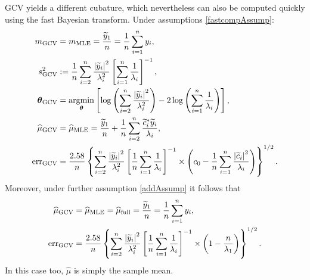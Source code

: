 \documentclass{iitthesis}          %
\newcommand{\bm}[1]{\boldsymbol{#1}}
\newcommand{\vtheta}{{\bm{\theta}}}
\newcommand{\hmu}{\widehat{\mu}}
\newcommand{\MLE}{\textup{MLE}}
\newcommand{\GCV}{\textup{GCV}}
\newcommand{\err}{\textup{err}}
\def\abs#1{\ensuremath{\left \lvert #1 \right \rvert}}
\providecommand{\argmin}{\operatorname*{argmin}}
\begin{document}
GCV yields a different cubature, which nevertheless can also be computed quickly using the fast Bayesian transform.  Under assumptions \eqref{fastcompAssump}:
\begin{align*}
\nonumber
m_{\textup{GCV}} & = m_\MLE =  \frac{\widetilde{y}_1}{n} = \frac 1n \sum_{i=1}^n y_i,\\
\nonumber 
s^2_{\textup{GCV}} & : =  \frac 1{n} \sum_{i=2}^n \frac{\abs{\widetilde{y}_i}^2}{\lambda_i^2}  \left [ \sum_{i=1}^n \frac{1}{\lambda_i} \right]^{-1}, \\
\vtheta_{\GCV} 
&= \argmin_\vtheta \left[ \log \left ( \sum_{i=2}^n \frac{\abs{\widetilde{y}_i}^2}{\lambda_i^2} 
\right) -2\log\left( \sum_{i=1}^n \frac{1}{\lambda_i} \right)
\right], \\
\nonumber
\hmu_{\GCV}
&= \hmu_\MLE  = \frac{\widetilde{y}_1}{n} +
\frac 1n \sum_{i=2}^n \frac{ \widetilde{c}_i^* \widetilde{y}_i}{\lambda_i}, \\
\nonumber
\err_{\textup{GCV}} & =
\frac{2.58}{n}\left\{\sum_{i=2}^n \frac{\abs{\widetilde{y}_i}^2}{\lambda_i^2}  \left [ \frac 1n \sum_{i=1}^n \frac{1}{\lambda_i} \right]^{-1}  \times
\left( c_0 - \frac 1n \sum_{i=1}^n \frac{\abs{\widetilde{c}_i}^2}{\lambda_i} \right) 
\right\}^{1/2}.
\end{align*}
Moreover, under further assumption \eqref{addAssump} it follows that 
\begin{align*}
\nonumber %
\hmu_{\textup{GCV}}
&= \hmu_\MLE = \hmu_{\textup{full}} =
\frac{\widetilde{y}_1}{n} = \frac 1n \sum_{i=1}^n y_i,\\
\err_{\textup{GCV}} & =
\frac{2.58}{n}\left\{\sum_{i=2}^n \frac{\abs{\widetilde{y}_i}^2}{\lambda_i^2}  \left [ \frac 1n \sum_{i=1}^n \frac{1}{\lambda_i} \right]^{-1}  \times
\left( 1 -  \frac{n}{\lambda_1} \right)  
\right\}^{1/2}.
\end{align*}
In this case too, $\hmu$ is simply the sample mean.
\end{document}
